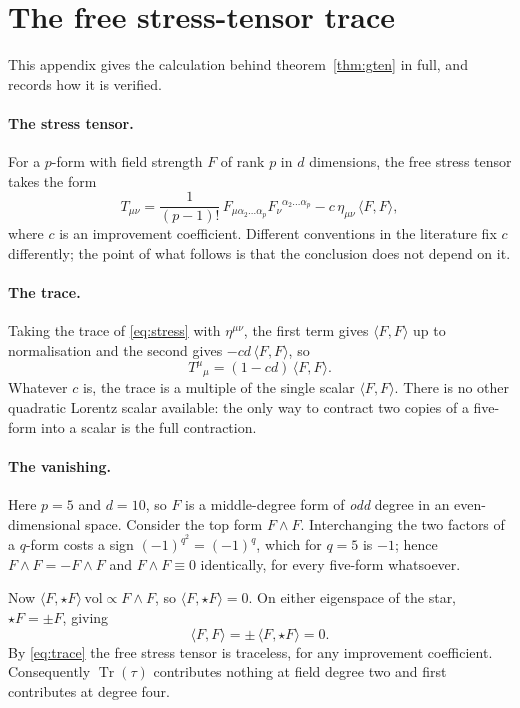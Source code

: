 \section{The free stress-tensor trace}
\label{app:gten}

This appendix gives the calculation behind theorem~\ref{thm:gten} in full, and
records how it is verified.

\paragraph{The stress tensor.}
For a $p$-form with field strength $F$ of rank $p$ in $d$ dimensions, the free
stress tensor takes the form
\begin{equation}
T_{\mu\nu}
 = \frac{1}{(p-1)!}\,F_{\mu\alpha_2\dots\alpha_p}
   F_\nu{}^{\alpha_2\dots\alpha_p}
 - c\,\eta_{\mu\nu}\,\langle F,F\rangle,
\label{eq:stress}
\end{equation}
where $c$ is an improvement coefficient. Different conventions in the literature
fix $c$ differently; the point of what follows is that the conclusion does not
depend on it.

\paragraph{The trace.}
Taking the trace of \eqref{eq:stress} with $\eta^{\mu\nu}$, the first term gives
$\langle F,F\rangle$ up to normalisation and the second gives
$-cd\,\langle F,F\rangle$, so
\begin{equation}
T^\mu{}_\mu = (1 - cd)\,\langle F,F\rangle .
\label{eq:trace}
\end{equation}
Whatever $c$ is, the trace is a multiple of the single scalar
$\langle F,F\rangle$. There is no other quadratic Lorentz scalar available: the
only way to contract two copies of a five-form into a scalar is the full
contraction.

\paragraph{The vanishing.}
Here $p = 5$ and $d = 10$, so $F$ is a middle-degree form of \emph{odd} degree in
an even-dimensional space. Consider the top form $F \wedge F$. Interchanging the
two factors of a $q$-form costs a sign $(-1)^{q^2} = (-1)^q$, which for $q = 5$
is $-1$; hence $F\wedge F = -F\wedge F$ and $F \wedge F \equiv 0$ identically,
for every five-form whatsoever.

Now $\langle F, \star F\rangle\,\mathrm{vol} \propto F \wedge F$, so
$\langle F, \star F\rangle = 0$. On either eigenspace of the star,
$\star F = \pm F$, giving
\begin{equation}
\langle F, F \rangle
 = \pm\,\langle F, \star F\rangle
 = 0 .
\end{equation}
By \eqref{eq:trace} the free stress tensor is traceless, for any improvement
coefficient. Consequently $\operatorname{Tr}(\tau)$ contributes nothing at field
degree two and first contributes at degree four.

